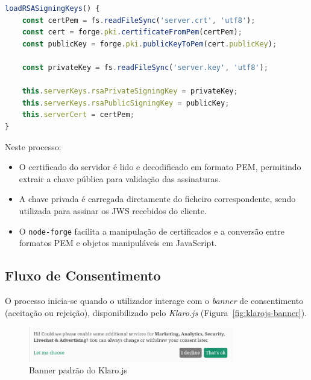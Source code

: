 \begin{lstlisting}[language=Javascript, caption={Carregamento das chaves RSA do servidor e do certificado associado}, label={lst:server-rsa-key-load}]
loadRSASigningKeys() {
	const certPem = fs.readFileSync('server.crt', 'utf8');
	const cert = forge.pki.certificateFromPem(certPem);
	const publicKey = forge.pki.publicKeyToPem(cert.publicKey);

	const privateKey = fs.readFileSync('server.key', 'utf8');

	this.serverKeys.rsaPrivateSigningKey = privateKey;
	this.serverKeys.rsaPublicSigningKey = publicKey;
	this.serverCert = certPem;
}
\end{lstlisting}

Neste processo:
\begin{itemize}
    \item O certificado do servidor é lido e decodificado em formato PEM, permitindo extrair a chave pública para validação das assinaturas.
    \item A chave privada é carregada diretamente do ficheiro correspondente, sendo utilizada para assinar os JWS recebidos do cliente.
    \item O \texttt{node-forge} facilita a manipulação de certificados e a conversão entre formatos PEM e objetos manipuláveis em JavaScript.
\end{itemize}

\subsection{Fluxo de Consentimento}

O processo inicia-se quando o utilizador interage com o \textit{banner} de consentimento (aceitação ou rejeição), disponibilizado pelo \textit{Klaro.js} (Figura~\ref{fig:klarojs-banner}).

\label{fig:klarojs-banner}
\begin{figure}[h]
    \centering
	\includegraphics[width=0.8\textwidth]{images/klaro_banner.png}
    \caption{Banner padrão do Klaro.js}
\end{figure}

